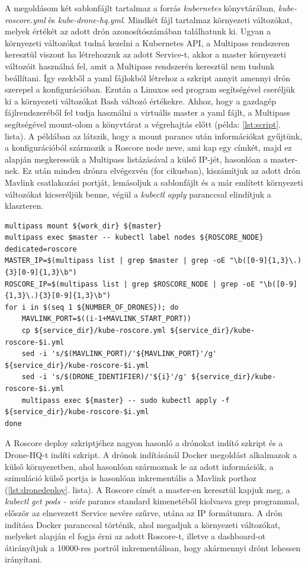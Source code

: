 \noindent
A megoldásom két sablonfájlt tartalmaz a forrás \emph{kubernetes} könyvtárában, \emph{kube-roscore.yml} és \emph{kube-drone-hq.yml}. Mindkét fájl tartalmaz környezeti változókat, melyek értékét az adott drón azonosítószámában találhatunk ki. Ugyan a környezeti változókat tudná kezelni a Kubernetes API, a Multipass rendszeren keresztül viszont ha létrehozzuk az adott Service-t, akkor a master környezeti változóit használná fel, amit a Multipass rendszerén keresztül nem tudunk beállítani. Így ezekből a yaml fájlokból létrehoz a szkript annyit amennyi drón szerepel a konfigurációban. Ezután a Linuxos sed program segítségével cseréljük ki a környezeti változókat Bash változó értékekre. Ahhoz, hogy a gazdagép fájlrendszeréből fel tudja használni a virtuális master a yaml fájlt, a Multipass segítségével mount-olom a könyvtárat a végrehajtás előtt (példa: \ref{lst:script}. lista). A példában az látszik, hogy a mount parancs után információkat gyűjtünk, a konfigurációból szármozik a Roscore node neve, ami kap egy címkét, majd ez alapján megkeressük a Multipass listázásával a külső IP-jét, hasonlóan a master-nek. Ez után minden drónra elvégezvén (for cikusban), kiszámítjuk az adott drón Mavlink csatlakozási portját, lemásoljuk a sablonfájlt és a már említett környezeti változókat kicseréljük benne, végül a \emph{kubectl apply} paranccsal elindítjuk a klaszteren. \\

\begin{minipage}{\linewidth}
\begin{lstlisting}[caption={Roscore információk összegyűjtése és deploy},label={lst:script}]
multipass mount ${work_dir} ${master}
multipass exec $master -- kubectl label nodes ${ROSCORE_NODE} dedicated=roscore
MASTER_IP=$(multipass list | grep $master | grep -oE "\b([0-9]{1,3}\.){3}[0-9]{1,3}\b")
ROSCORE_IP=$(multipass list | grep $ROSCORE_NODE | grep -oE "\b([0-9]{1,3}\.){3}[0-9]{1,3}\b")
for i in $(seq 1 ${NUMBER_OF_DRONES}); do
	MAVLINK_PORT=$((i-1+MAVLINK_START_PORT))
	cp ${service_dir}/kube-roscore.yml ${service_dir}/kube-roscore-$i.yml
	sed -i 's/$(MAVLINK_PORT)/'${MAVLINK_PORT}'/g' ${service_dir}/kube-roscore-$i.yml
	sed -i 's/$(DRONE_IDENTIFIER)/'${i}'/g' ${service_dir}/kube-roscore-$i.yml
	multipass exec ${master} -- sudo kubectl apply -f ${service_dir}/kube-roscore-$i.yml
done
\end{lstlisting}
\end{minipage}

\noindent
A Roscore deploy szkriptjéhez nagyon hasonló a drónokat indító szkript és a Drone-HQ-t indíti szkript. A drónok indításánál Docker megoldást alkalmazok a külső környezetben, ahol hasonlóan szármoznak le az adott információk, a szimuláció külső portja is hasonlóan inkrementális a Mavlink porthoz (\ref{lst:dronedeploy}. lista). A Roscore címét a master-en keresztül kapjuk meg, a \emph{kubectl get pods - wide} parancs standard kimenetéből kiolvasva grep programmal, először az elnevezett Service nevére szűrve, utána az IP formátumra. A drón indítása Docker paranccsal történik, ahol megadjuk a környezeti változókat, melyeket alapján el fogja érni az adott Roscore-t, illetve a dashboard-ot átirányítjuk a 10000-res portról inkrementálisan, hogy akármennyi drónt lehessen irányítani.

